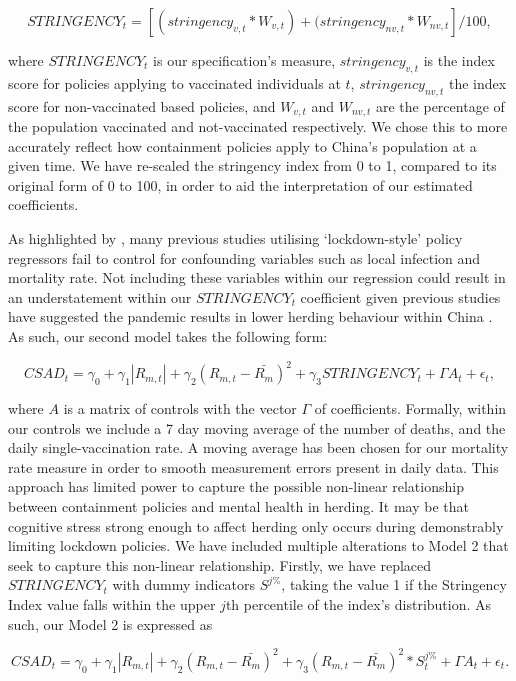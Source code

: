 \documentclass[12pt]{article}
\numberwithin{table}{section}   %
\begin{document}
$$
STRINGENCY_t=[(stringency_{v,t}*W_{v,t})+(stringency_{nv,t}*W_{nv,t}]/100,
$$


where $STRINGENCY_t$ is our specification’s measure, $stringency_{v,t}$ is the index score for policies applying to vaccinated individuals at $t$, $stringency_{nv,t}$ the index score for non-vaccinated based policies, and $W_{v,t}$ and $W_{nv,t}$ are the percentage of the population vaccinated and not-vaccinated respectively. We chose this to more accurately reflect how containment policies apply to China’s population at a given time. We have re-scaled the stringency index from 0 to 1, compared to its original form of 0 to 100, in order to aid the interpretation of our estimated coefficients.

As highlighted by \citet{aknin}, many previous studies utilising ‘lockdown-style’ policy regressors fail to control for confounding variables such as local infection and mortality rate. Not including these variables within our regression could result in an understatement within our $STRINGENCY_t$ coefficient given previous studies have suggested the pandemic results in lower herding behaviour within China \citep{wu}. As such, our second model takes the following form:

\begin{equation}\label{model-2}
CSAD_t=\gamma_0+\gamma_1 |R_{m,t}|+\gamma_2 (R_{m,t}-\bar{R_m})^2+\gamma_3STRINGENCY_t+\Gamma{A}_t+\epsilon_t,
\end{equation}

where $A$ is a matrix of controls with the vector $\Gamma$ of coefficients. Formally, within our controls we include a 7 day moving average of the number of deaths, and the daily single-vaccination rate. A moving average has been chosen for our mortality rate measure in order to smooth measurement errors present in daily data. 
This approach has limited power to capture the possible non-linear relationship between containment policies and mental health in herding. It may be that cognitive stress strong enough to affect herding only occurs during demonstrably limiting lockdown policies. We have included multiple alterations to Model 2 that seek to capture this non-linear relationship. Firstly, we have replaced $STRINGENCY_t$ with dummy indicators $S^{j\%}$, taking the value 1 if the Stringency Index value falls within the upper $j$th percentile of the index’s distribution. As such, our Model 2 is expressed as

\begin{equation}\label{model-3}
CSAD_t=\gamma_0+\gamma_1 |R_{m,t}|+\gamma_2 (R_{m,t}-\bar{R_m})^2+\gamma_3(R_{m,t}-\bar{R_m})^2*S_t^{j\%}+\Gamma{A}_t+\epsilon_t.
\end{equation}
\end{document}
